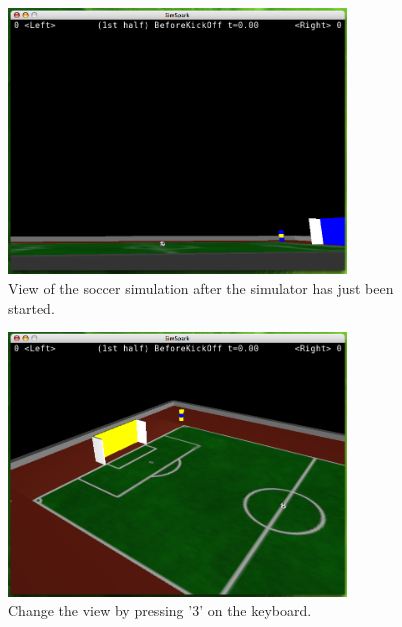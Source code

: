 \begin{figure}[htbp]
\begin{center}
\includegraphics[width=0.8\textwidth]{fig/startup}
\caption{View of the soccer simulation after the simulator has just been started.}
\label{fig:startup}
\end{center}
\end{figure}

\begin{figure}[htbp]
\begin{center}
\includegraphics[width=0.8\textwidth]{fig/press3}
\caption{Change the view by pressing '3' on the keyboard.}
\label{fig:press3}
\end{center}
\end{figure}

